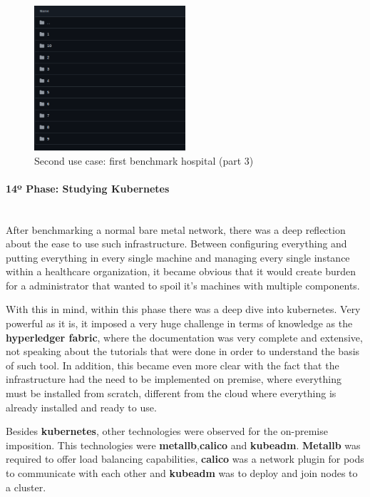 \begin{figure}[H]
    \centering
    \includegraphics[width=0.5\textwidth]{assets/use-case-2/first-benchmarking-hospital3.png} %
    \caption{Second use case: first benchmark hospital (part 3)}
    \label{fig:sample-image} 
\end{figure}
\paragraph{14º Phase: Studying Kubernetes}\mbox{}\\
After benchmarking a normal bare metal network, there was a deep reflection about the ease to use such infrastructure. Between configuring everything and putting everything in every single machine and managing every single instance within a healthcare organization, it became obvious that it would create burden for a administrator that wanted to spoil it's machines with multiple components. 

With this in mind, within this phase there was a deep dive into kubernetes. Very powerful as it is, it imposed a very huge challenge in terms of knowledge as the \textbf{hyperledger fabric}, where the documentation was very complete and extensive, not speaking about the tutorials that were done in order to understand the basis of such tool. In addition, this became even more clear with the fact that the infrastructure had the need to be implemented on premise, where everything must be installed from scratch, different from the cloud where everything is already installed and ready to use.

Besides \textbf{kubernetes}, other technologies were observed for the on-premise imposition. This technologies were \textbf{metallb},\textbf{calico} and \textbf{kubeadm}. \textbf{Metallb} was required to offer load balancing capabilities, \textbf{calico} was a network plugin for pods to communicate with each other and \textbf{kubeadm} was to deploy and join nodes to a cluster.

